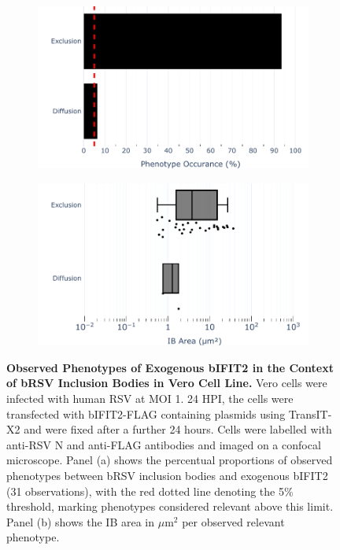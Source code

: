 \begin{figure}
    \begin{subfigure}{0.495\textwidth}
        \caption{}
        \includegraphics[width=1\linewidth]{09. Chapter 4/Figs/02. Overexpression/02. IFIT2/07. bar_bi2f_brsv.pdf} 
    \end{subfigure}
    \begin{subfigure}{0.495\textwidth}
        \caption{}
        \includegraphics[width=1\linewidth]{09. Chapter 4/Figs/02. Overexpression/02. IFIT2/08. box_bi2f_brsv.pdf}
    \end{subfigure}
    \caption[Observed Phenotypes of Exogenous bIFIT2 in the Context of bRSV Inclusion Bodies in Vero Cell Line.]{\textbf{Observed Phenotypes of Exogenous bIFIT2 in the Context of bRSV Inclusion Bodies in Vero Cell Line.} Vero cells were infected with human RSV at MOI 1. 24 HPI, the cells were transfected with bIFIT2-FLAG containing plasmids using TransIT-X2 and were fixed after a further 24 hours. Cells were labelled with anti-RSV N and anti-FLAG antibodies and imaged on a confocal microscope. Panel (a) shows the percentual proportions of observed phenotypes between bRSV inclusion bodies and exogenous bIFIT2 (31 observations), with the red dotted line denoting the 5\% threshold, marking phenotypes considered relevant above this limit. Panel (b) shows the IB area in \(\mu \mbox{m}^2\) per observed relevant phenotype.}
    \label{fig:Observed Phenotypes of Exogenous bIFIT2 in the Context of bRSV Inclusion Bodies in Vero Cell Line}
\end{figure}

